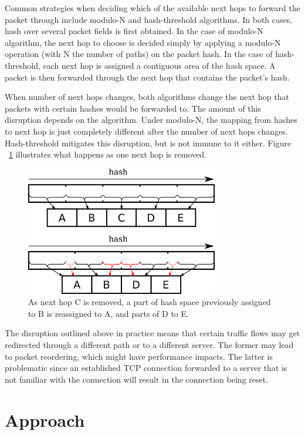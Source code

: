 \documentclass[letterpaper]{article}
\begin{document}
Common strategies when deciding which of the available next hops to forward
the packet through include modulo-N and hash-threshold
algorithms\protect\cite{rfc2992}. In both cases, hash over several packet
fields is first obtained. In the case of modulo-N algorithm, the next hop
to choose is decided simply by applying a modulo-N operation (with N the
number of paths) on the packet hash. In the case of hash-threshold, each
next hop is assigned a contiguous area of the hash space. A packet is then
forwarded through the next hop that contains the packet's hash.

When number of next hops changes, both algorithms change the next hop that
packets with certain hashes would be forwarded to. The amount of this
disruption depends on the algorithm. Under modulo-N, the mapping from
hashes to next hop is just completely different after the number of next
hops changes. Hash-threshold mitigates this disruption, but is not immune
to it either. Figure ~\ref{fig:hash-threshold-disruption} illustrates what
happens as one next hop is removed.

\begin{figure}[H]
\includegraphics[width=3.31in]{hash-threshold-disruption.png}
\caption{As next hop C is removed, a part of hash space previously assigned
  to B is reassigned to A, and parts of D to E.}
\label{fig:hash-threshold-disruption}
\end{figure}

The disruption outlined above in practice means that certain traffic flows
may get redirected through a different path or to a different server. The
former may lead to packet reordering, which might have performance impacts.
The latter is problematic since an established TCP connection forwarded to
a server that is not familiar with the connection will result in the
connection being reset.

\section{Approach}
\end{document}
